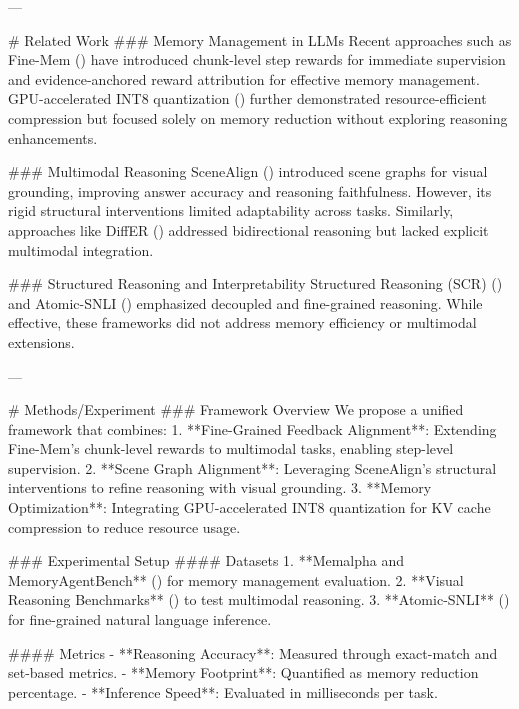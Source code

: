 ---

# Related Work  
### Memory Management in LLMs  
Recent approaches such as Fine-Mem (\cite{ma2026finememfinegrainedfeedbackalignment}) have introduced chunk-level step rewards for immediate supervision and evidence-anchored reward attribution for effective memory management. GPU-accelerated INT8 quantization (\cite{taneja2026gpuacceleratedint8quantizationkv}) further demonstrated resource-efficient compression but focused solely on memory reduction without exploring reasoning enhancements.  

### Multimodal Reasoning  
SceneAlign (\cite{wang2026scenealignaligningmultimodalreasoning}) introduced scene graphs for visual grounding, improving answer accuracy and reasoning faithfulness. However, its rigid structural interventions limited adaptability across tasks. Similarly, approaches like DiffER (\cite{he2026differdiffusionentityrelationmodeling}) addressed bidirectional reasoning but lacked explicit multimodal integration.  

### Structured Reasoning and Interpretability  
Structured Reasoning (SCR) (\cite{han2026structuredreasoninglargelanguage}) and Atomic-SNLI (\cite{huang2026atomicsnlifinegrainednaturallanguage}) emphasized decoupled and fine-grained reasoning. While effective, these frameworks did not address memory efficiency or multimodal extensions.  

---

# Methods/Experiment  
### Framework Overview  
We propose a unified framework that combines:  
1. **Fine-Grained Feedback Alignment**: Extending Fine-Mem’s chunk-level rewards to multimodal tasks, enabling step-level supervision.  
2. **Scene Graph Alignment**: Leveraging SceneAlign’s structural interventions to refine reasoning with visual grounding.  
3. **Memory Optimization**: Integrating GPU-accelerated INT8 quantization for KV cache compression to reduce resource usage.  

### Experimental Setup  
#### Datasets  
1. **Memalpha and MemoryAgentBench** (\cite{ma2026finememfinegrainedfeedbackalignment}) for memory management evaluation.  
2. **Visual Reasoning Benchmarks** (\cite{wang2026scenealignaligningmultimodalreasoning}) to test multimodal reasoning.  
3. **Atomic-SNLI** (\cite{huang2026atomicsnlifinegrainednaturallanguage}) for fine-grained natural language inference.  

#### Metrics  
- **Reasoning Accuracy**: Measured through exact-match and set-based metrics.  
- **Memory Footprint**: Quantified as memory reduction percentage.  
- **Inference Speed**: Evaluated in milliseconds per task.  

